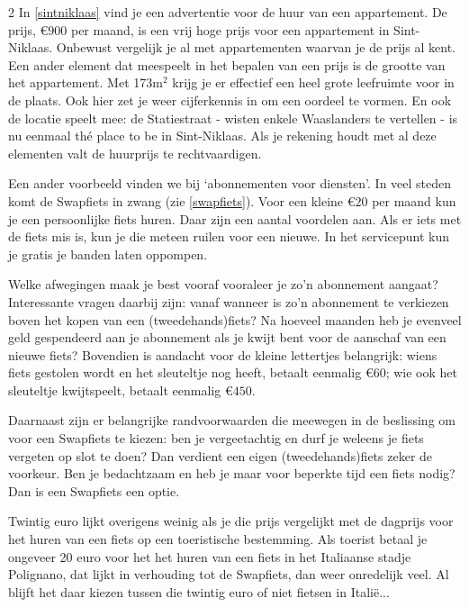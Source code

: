 \begin{multicols}{2}
In \autoref{sintniklaas} vind je een advertentie voor de huur van een appartement. De prijs, $\euro 900$ per maand, is een vrij hoge prijs voor een appartement in Sint-Niklaas. Onbewust vergelijk je al met appartementen waarvan je de prijs al kent. Een ander element dat meespeelt in het bepalen van een prijs is de grootte van het appartement. Met 173m$^2$ krijg je er effectief een heel grote leefruimte voor in de plaats. Ook hier zet je weer cijferkennis in om een oordeel te vormen. En ook de locatie speelt mee: de Statiestraat - wisten enkele Waaslanders te vertellen - is nu eenmaal thé place to be in Sint-Niklaas. Als je rekening houdt met al deze elementen valt de huurprijs te rechtvaardigen. 

Een ander voorbeeld vinden we bij ‘abonnementen voor diensten'. In veel steden komt de Swapfiets in zwang (zie \autoref{swapfiets}). Voor een kleine $\euro 20$ per maand kun je een persoonlijke fiets huren. Daar zijn een aantal voordelen aan. Als er iets met de fiets mis is, kun je die meteen ruilen voor een nieuwe. In het servicepunt kun je gratis je banden laten oppompen. 

Welke afwegingen maak je best vooraf vooraleer je zo'n abonnement aangaat? Interessante vragen daarbij zijn: vanaf wanneer is zo'n abonnement te verkiezen boven het kopen van een (tweedehands)fiets? Na hoeveel maanden heb je evenveel geld gespendeerd aan je abonnement als je kwijt bent voor de aanschaf van een nieuwe fiets? Bovendien is aandacht voor de kleine lettertjes belangrijk: wiens fiets gestolen wordt en het sleuteltje nog heeft, betaalt eenmalig $\euro 60$; wie ook het sleuteltje kwijtspeelt, betaalt eenmalig $\euro 450$. 

Daarnaast zijn er belangrijke randvoorwaarden die meewegen in de beslissing om voor een Swapfiets te kiezen: ben je vergeetachtig en durf je weleens je fiets vergeten op slot te doen? Dan verdient een eigen (tweedehands)fiets zeker de voorkeur. Ben je bedachtzaam en heb je maar voor beperkte tijd een fiets nodig? Dan is een Swapfiets een optie. 

Twintig euro lijkt overigens weinig als je die prijs vergelijkt met de dagprijs voor het huren van een fiets op een toeristische bestemming. Als toerist betaal je ongeveer 20 euro voor het het huren van een fiets in het Italiaanse stadje Polignano, dat lijkt in verhouding tot de Swapfiets, dan weer onredelijk veel. Al blijft het daar kiezen tussen die twintig euro of niet fietsen in Italië...  


\end{multicols}
